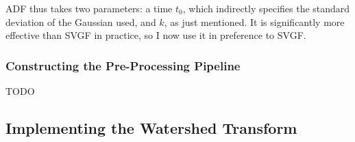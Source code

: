 ADF thus takes two parameters: a time $t_0$, which indirectly specifies the standard deviation of the Gaussian used, and $k$, as just mentioned. It is significantly more effective than SVGF in practice, so I now use it in preference to SVGF.

\subsubsection{Constructing the Pre-Processing Pipeline}

TODO

\subsection{Implementing the Watershed Transform}

